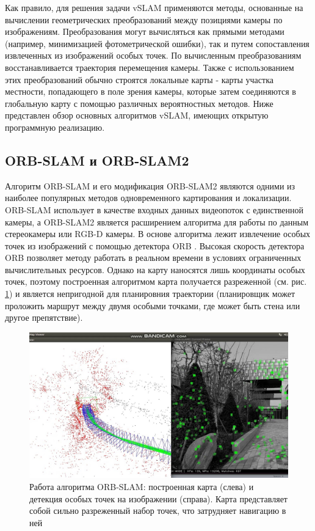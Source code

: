 \documentclass{mipt-thesis-ms}
\begin{document}
	Как правило, для решения задачи vSLAM применяются методы, основанные на вычислении геометрических преобразований между позициями камеры по изображениям. Преобразования могут вычисляться как прямыми методами (например, минимизацией фотометрической ошибки), так и путем сопоставления извлеченных из изображений особых точек. По вычисленным преобразованиям восстанавливается траектория перемещения камеры. Также с использованием этих преобразований обычно строятся локальные карты - карты участка местности, попадающего в поле зрения камеры, которые затем соединяются в глобальную карту с помощью различных вероятностных методов. Ниже представлен обзор основных алгоритмов vSLAM, имеющих открытую программную реализацию.
	
	\subsection{ORB-SLAM и ORB-SLAM2}
	
	Алгоритм ORB-SLAM \cite{mur2015orb} и его модификация ORB-SLAM2 \cite{mur2017orb} являются одними из наиболее популярных методов одновременного картирования и локализации. ORB-SLAM использует в качестве входных данных видеопоток с единственной камеры, а ORB-SLAM2 является расширением алгоритма для работы по данным стереокамеры или RGB-D камеры. В основе алгоритма лежит извлечение особых точек из изображений с помощью детектора ORB \cite{rublee2011orb}. Высокая скорость детектора ORB позволяет методу работать в реальном времени в условиях ограниченных вычислительных ресурсов. Однако на карту наносятся лишь координаты особых точек, поэтому построенная алгоритмом карта получается разреженной (см. рис. \ref{figure_orb_slam_map}) и является непригодной для планировния траектории (планировщик может проложить маршрут между двумя особыми точками, где может быть стена или другое препятствие).

	\begin{figure}
		\includegraphics[width=1.0\textwidth]{img/orb_slam_map.jpg}
		\caption{Работа алгоритма ORB-SLAM: построенная карта (слева) и детекция особых точек на изображении (справа). Карта представляет собой сильно разреженный набор точек, что затрудняет навигацию в ней}
		\label{figure_orb_slam_map}
	\end{figure}
\end{document}
